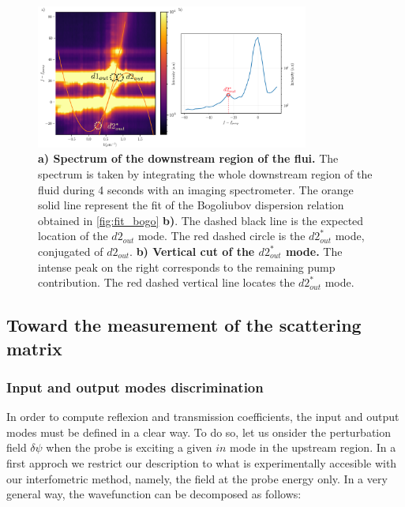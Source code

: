\begin{figure}
    \centering
    \includegraphics[width=0.8\textwidth]{chap_stimulated_hawking/fig/disp_supersonic_spectro.pdf}
    \caption{\textbf{a) Spectrum of the downstream region of the flui.} The spectrum is taken by integrating the whole downstream region of the fluid during 4 seconds
    with an imaging spectrometer. The orange solid line represent the fit of the Bogoliubov dispersion relation obtained in \autoref{fig:fit_bogo} \textbf{b)}. The dashed black line is the expected location of the $d2_{out}$ mode.
    The red dashed circle is the $d2_{out}^*$ mode, conjugated of $d2_{out}$. 
    \textbf{b) Vertical cut of the $d2_{out}^*$ mode.} The intense peak on the right corresponds to the remaining pump contribution. The red dashed vertical line locates the $d2_{out}^*$ mode.}
    \label{fig:spectrum_spectro}
\end{figure}
\bigskip

\subsection{Toward the measurement of the scattering matrix}
\label{sec:scattering_matrix_measurement}
\subsubsection{Input and output modes discrimination}
In order to compute reflexion and transmission coefficients, the input and output modes must be defined in a clear way.
To do so, let us onsider the perturbation field $\delta\psi$ when the probe is exciting a given $in$ mode in the upstream region. In a first approch we restrict our description to 
what is experimentally accesible with our interfometric method, namely, the field at the probe energy only. In a very general way, the wavefunction can be decomposed as follows:

